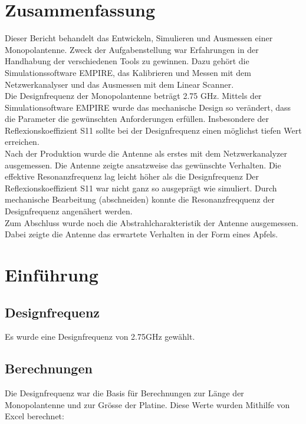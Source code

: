 

	\vspace*{15 mm}

\section{Zusammenfassung}

Dieser Bericht behandelt das Entwickeln, Simulieren und Ausmessen einer Monopolantenne. Zweck der Aufgabenstellung war Erfahrungen in der Handhabung der verschiedenen Tools zu gewinnen. Dazu gehört die Simulationssoftware EMPIRE, das Kalibrieren und Messen mit dem Netzwerkanalyser und das Ausmessen mit dem Linear Scanner.\\
Die Designfrequenz der Monopolantenne beträgt 2.75 GHz. Mittels der Simulationsoftware EMPIRE wurde das mechanische Design so verändert, dass die Parameter die gewünschten Anforderungen erfüllen. Insbesondere der Reflexionskoeffizient S11 sollte bei der Designfrequenz einen möglichst tiefen Wert erreichen.\\
Nach der Produktion wurde die Antenne als erstes mit dem Netzwerkanalyzer ausgemessen. Die Antenne zeigte ansatzweise das gewünschte Verhalten. Die effektive Resonanzfrequenz lag leicht höher als die Designfrequenz Der Reflexionskoeffizient S11 war nicht ganz so ausgeprägt wie simuliert. Durch mechanische Bearbeitung (abschneiden) konnte die Resonanzfreqquenz der Designfrequenz angenähert werden.\\
Zum Abschluss wurde noch die Abstrahlcharakteristik der Antenne ausgemessen. Dabei zeigte die Antenne das erwartete Verhalten in der Form eines Apfels.

\newpage

\section{Einführung}



\subsection{Designfrequenz}
Es wurde eine Designfrequenz von 2.75GHz gewählt.\\

\subsection{Berechnungen}
Die Designfrequenz war die Basis für Berechnungen zur Länge der Monopolantenne und zur Grösse der Platine. Diese Werte wurden Mithilfe von Excel berechnet:
\vspace{3mm}

